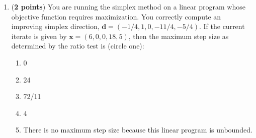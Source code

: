 \documentclass[10pt]{article}
\begin{document}
\begin{enumerate}
\item ({\bf 2 points}) You are running the simplex method on a linear program whose objective function requires maximization.  You correctly compute an improving simplex direction, $\mathbf{d} = (-1/4, 1, 0, -11/4, -5/4)$.  If the current iterate is given by $\mathbf{x} = (6, 0, 0, 18, 5)$, then the maximum step size as determined by the ratio test is (circle one):  
\begin{enumerate}
\item 0
\item 24
\item 72/11
\item 4
\item There is no maximum step size because this linear program is unbounded.
\end{enumerate}


\vfill
\end{enumerate}
\end{document}
